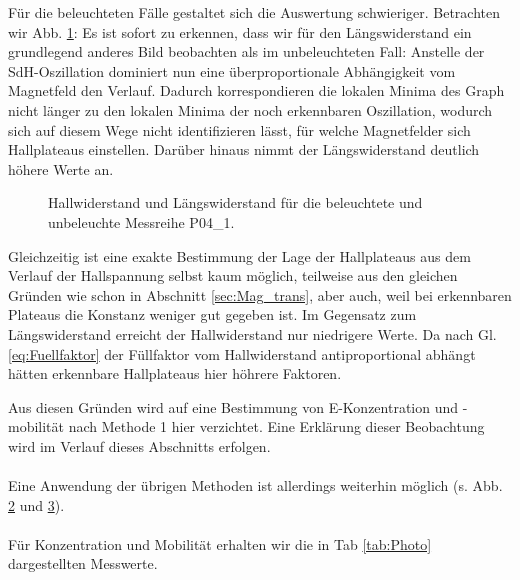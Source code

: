Für die beleuchteten Fälle gestaltet sich die Auswertung schwieriger. Betrachten wir Abb. \ref{abb:P04_Compare}: Es ist sofort zu erkennen, dass wir für den Längswiderstand ein grundlegend anderes Bild beobachten als im unbeleuchteten Fall: Anstelle der SdH-Oszillation dominiert nun eine überproportionale Abhängigkeit vom Magnetfeld den Verlauf. Dadurch korrespondieren die lokalen Minima des Graph nicht länger zu den lokalen Minima der noch erkennbaren Oszillation, wodurch sich auf diesem Wege nicht identifizieren lässt, für welche Magnetfelder sich Hallplateaus einstellen. Darüber hinaus nimmt der Längswiderstand deutlich höhere Werte an.

\begin{figure}[h!]
	\centering
	
	\caption{Hallwiderstand und Längswiderstand für die beleuchtete und unbeleuchte Messreihe P04\_1.}
	\label{abb:P04_Compare}
\end{figure}
Gleichzeitig ist eine exakte Bestimmung der Lage der Hallplateaus aus dem Verlauf der Hallspannung selbst kaum möglich, teilweise aus den gleichen Gründen wie schon in Abschnitt \ref{sec:Mag_trans}, aber auch, weil bei erkennbaren Plateaus die Konstanz weniger gut gegeben ist. Im Gegensatz zum Längswiderstand erreicht der Hallwiderstand nur niedrigere Werte. Da nach Gl. \ref{eq:Fuellfaktor} der Füllfaktor vom Hallwiderstand antiproportional abhängt hätten erkennbare Hallplateaus hier höhrere Faktoren.
 
Aus diesen Gründen wird auf eine Bestimmung von E-Konzentration und -mobilität nach Methode 1 hier verzichtet. Eine Erklärung dieser Beobachtung wird im Verlauf dieses Abschnitts erfolgen. \\
\\
Eine Anwendung der übrigen Methoden ist allerdings weiterhin möglich (s. Abb. \ref{abb:P04_Meth_2} und \ref{abb:P04_Meth_3}). \\ 
\\
Für Konzentration und Mobilität erhalten wir die in Tab \ref{tab:Photo} dargestellten Messwerte. \\
\\

\begin{figure}[h!]
	\centering
	
	\caption{}
	\label{abb:P04_Meth_2}
\end{figure}

\begin{figure}[h!]
	\centering
	
	\caption{}
	\label{abb:P04_Meth_3}
\end{figure}


